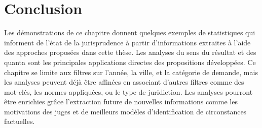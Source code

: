 \section{Conclusion}
\label{sec:demo:conclusion}
Les démonstrations de ce chapitre donnent quelques exemples de statistiques qui informent de l'état de la jurisprudence à partir d'informations extraites à l'aide des approches proposées dans cette thèse. Les analyses du sens du résultat et des quanta sont les principales applications directes des propositions développées. Ce chapitre se limite aux filtres sur l'année, la ville, et la catégorie de demande, mais les analyses peuvent déjà être affinées en associant d'autres filtres comme  des mot-clés, les normes appliquées, ou le type de juridiction. Les analyses pourront être enrichies grâce l'extraction future de nouvelles informations comme les motivations des juges et de meilleurs modèles d'identification de circonstances factuelles.